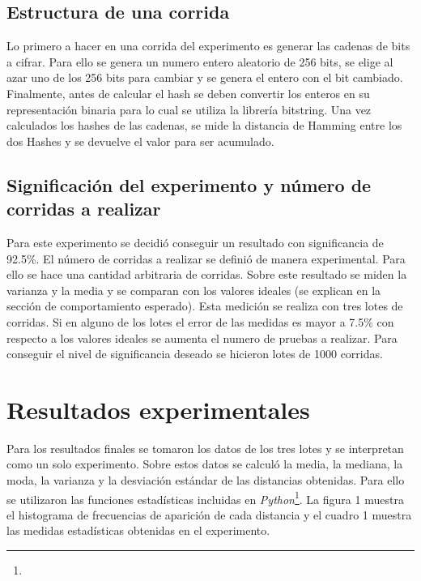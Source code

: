 \documentclass[a4paper]{article}
\begin{document}
\subsection{Estructura de una corrida}
Lo primero a hacer en una corrida del experimento es generar las cadenas de bits a cifrar. Para ello se genera un numero 
entero aleatorio de 256 bits, se elige al azar uno de los 256 bits para cambiar y se genera el entero con el bit cambiado. 
Finalmente, antes de calcular el hash se deben convertir los enteros en su representación binaria para lo cual se utiliza 
la librería bitstring. Una vez calculados los hashes de las cadenas, se mide la distancia de Hamming 
entre los dos Hashes y se devuelve el valor para ser acumulado.
 
 \subsection{Significación del experimento y número de corridas a realizar}
 Para este experimento se decidió conseguir un resultado con significancia de 92.5\%. El número de corridas a realizar 
 se definió de manera experimental. Para ello se hace una cantidad arbitraria de corridas. Sobre este resultado se miden
 la varianza y la media y se comparan con los valores ideales (se explican en la sección de comportamiento esperado). Esta
 medición se realiza con tres lotes de corridas. Si en alguno de los lotes el error de las medidas es mayor a 7.5\% con 
 respecto a los valores ideales se aumenta el numero de pruebas a realizar. Para conseguir el nivel de significancia deseado
 se hicieron lotes de 1000 corridas.

\section{Resultados experimentales}

Para los resultados finales se tomaron los datos de los tres lotes y se interpretan como un solo experimento. Sobre estos 
datos se calculó la media, la mediana, la moda, la varianza y la desviación estándar de las distancias obtenidas. Para ello se
utilizaron las funciones estadísticas incluidas en \emph{Python}\footnote{}. 
La figura 1 muestra el histograma de frecuencias de aparición de cada distancia y el cuadro 1 muestra las medidas estadísticas 
obtenidas en el experimento.

\begin{figure}
\begin{floatrow}
\end{floatrow}
\end{figure}
\end{document}
